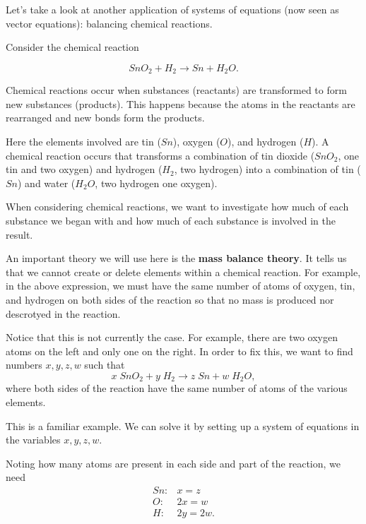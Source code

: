 \documentclass{ximera}
\begin{document}
\begin{exploration}

  Let's take a look at another application of systems of equations (now seen as vector equations): balancing chemical reactions.

 Consider
  the chemical reaction%

  \begin{equation*}
    SnO_2+H_2\rightarrow Sn+H_2O.
  \end{equation*}

Chemical reactions occur when substances (reactants) are transformed to form new substances (products). This happens because the atoms in the reactants are rearranged and new bonds form the products. 

Here the elements involved are tin ($Sn$), oxygen ($O$), and hydrogen
($H$). A chemical reaction occurs that transforms a combination of tin
dioxide ($SnO_2$, one tin and two oxygen) and hydrogen ($H_2$, two hydrogen) into a combination of tin
($Sn$) and water ($H_2O$, two hydrogen one oxygen). 

When considering chemical reactions, we
want to investigate how much of each substance we began with and how
much of each substance is involved in the result.

An important theory we will use here is the {\bf mass balance theory}. It
tells us that we cannot create or delete elements within a chemical
reaction. For example, in the above expression, we must have the same
number of atoms of oxygen, tin, and hydrogen on both sides of the
reaction so that no mass is produced nor descrotyed in the reaction. 

Notice that this is not currently the case.  For example,
there are two oxygen atoms on the left and only one on the right. In
order to fix this, we want to find numbers $x,y,z,w$ such that
\begin{equation*}
  x\;SnO_2+y\;H_2\rightarrow z\;Sn+w\;H_2O,
\end{equation*}
where both sides of the reaction have the same number of atoms of the
various elements.

\begin{example}

This is a familiar example. We can solve it by setting up a system of
equations in the variables $x,y,z,w$. 

Noting how many atoms are present in each side and part of the reaction, we need
\begin{equation*}
  \begin{array}{cl}
    Sn: & x=z \\
    O: & 2x=w \\
    H: & 2y=2w.
  \end{array}
\end{equation*}


\end{example}
\end{exploration}
\end{document}
